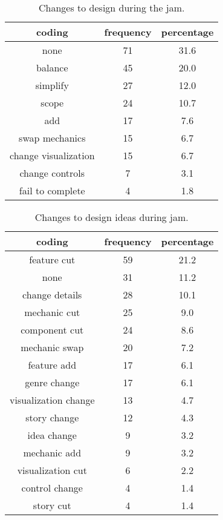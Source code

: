 \documentclass{sig-alternate}
\begin{document}
\begin{table}[b]
\centering
\scriptsize
\begin{tabular}{|c|c|c|}
\hline coding & frequency & percentage \\ 
\hline none & 71 & 31.6 \\ 
\hline balance & 45 & 20.0 \\ 
\hline simplify & 27 & 12.0 \\ 
\hline scope & 24 & 10.7 \\ 
\hline add & 17 & 7.6 \\ 
\hline swap mechanics & 15 & 6.7  \\ 
\hline change visualization & 15 & 6.7 \\ 
\hline change controls & 7 & 3.1 \\ 
\hline fail to complete & 4 & 1.8 \\ 
\hline 
\end{tabular} 
\caption{Changes to design during the jam.}
\label{tab:sys_changes}
\end{table}

\begin{table}[tb]
\centering
\scriptsize
\begin{tabular}{|c|c|c|}
\hline coding & frequency & percentage \\ 
\hline feature cut & 59 & 21.2 \\ 
\hline none & 31 & 11.2 \\ 
\hline change details & 28 & 10.1 \\ 
\hline mechanic cut & 25 & 9.0 \\ 
\hline component cut & 24 & 8.6 \\ 
\hline mechanic swap & 20 & 7.2 \\ 
\hline feature add & 17 & 6.1 \\ 
\hline genre change & 17 & 6.1 \\ 
\hline visualization change & 13 & 4.7 \\ 
\hline story change & 12 & 4.3 \\ 
\hline idea change & 9 & 3.2 \\ 
\hline mechanic add & 9 & 3.2 \\ 
\hline visualization cut & 6 & 2.2 \\ 
\hline control change & 4 & 1.4 \\ 
\hline story cut & 4 & 1.4 \\ 
\hline 
\end{tabular} 
\caption{Changes to design ideas during jam.}
\label{tab:idea_changes}
\end{table}
\end{document}
